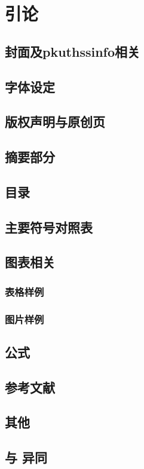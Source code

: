 \chapter{引论}
\label{chap:introduction}

\section{封面及pkuthssinfo相关}
\label{sec:cover-pkuthssinfo}

\section{字体设定}
\label{sec:fontset}

\section{版权声明与原创页}
\label{sec:copy-origin}

\section{摘要部分}
\label{sec:abstract}

\section{目录}
\label{sec:directory}

\section{主要符号对照表}
\label{sec:denotation}

\section{图表相关}
\label{sec:table-figure}

\subsection{表格样例}
\label{sec:table-example}

\subsection{图片样例}
\label{sec:figure-example}

\section{公式}
\label{sec:equation}

\section{参考文献}
\label{sec:bibtex}

\section{其他}
\label{sec:other}

\section{与\pkuthss{} \iofubaseversion{}异同}


